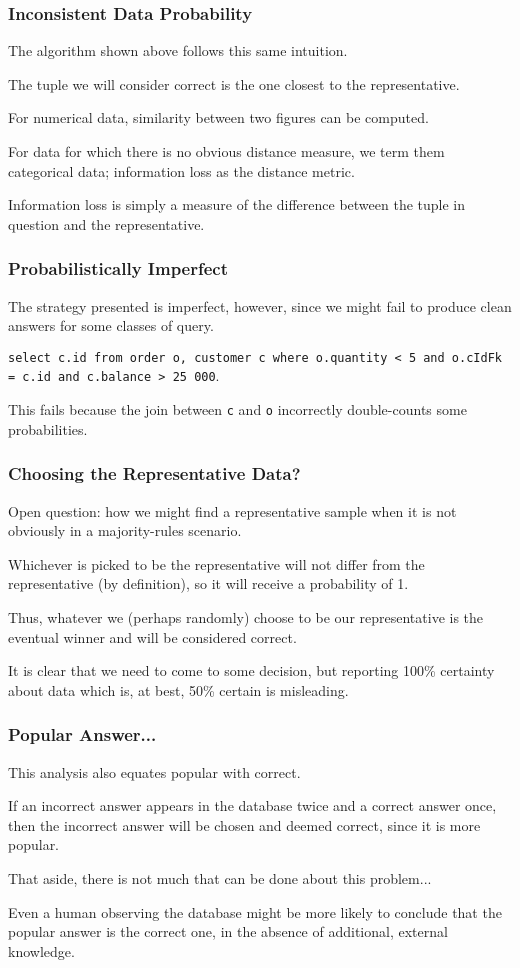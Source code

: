 \begin{frame}
\frametitle{Inconsistent Data Probability}

The algorithm shown above follows this same intuition. 

The tuple we will consider correct is the one closest to the representative. 

For numerical data, similarity between two figures can be computed. 

For data for which there is no obvious distance measure, we term them \alert{categorical data}; information loss as the distance metric.

Information loss is simply a measure of the difference between  the tuple in question and the representative. 

\end{frame}

\begin{frame}
\frametitle{Probabilistically  Imperfect}

The strategy presented is imperfect, however, since we might fail to produce clean answers for some classes of query.

\texttt{select c.id from order o, customer c  where o.quantity < 5 and o.cIdFk = c.id and c.balance > 25~000}. 

This fails because the join between \texttt{c} and \texttt{o} incorrectly double-counts some probabilities.

\end{frame}


\begin{frame}
\frametitle{Choosing the Representative Data?}

Open question: how we might find a representative sample when it is not obviously in a majority-rules scenario.

Whichever is picked to be the representative will not differ from the representative (by definition), so it will receive a probability of 1. 

Thus, whatever we (perhaps randomly) choose to be our representative is the eventual winner and will be considered correct. 

It is clear that we need to come to some decision, but reporting 100\% certainty about data which is, at best, 50\% certain is misleading. 

\end{frame}

\begin{frame}
\frametitle{Popular Answer...}

This analysis also equates popular with correct.

If an incorrect answer appears in the database twice and a correct answer once, then the incorrect answer will be chosen and deemed correct, since it is more popular. 

That aside, there is not much that can be done about this problem... 

Even a human observing the database might be more likely to conclude that the popular answer is the correct one, in the absence of additional, external knowledge.

\end{frame}


